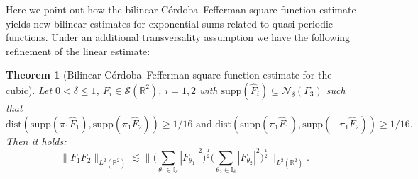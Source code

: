 \documentclass{amsart}
\newtheorem{theorem}{Theorem}[section]
\theoremstyle{definition}
\newcommand{\R}{\mathbb{R}}
\begin{document}
Here we point out how the bilinear C\'ordoba--Fefferman square function estimate yields new bilinear estimates for exponential sums related to quasi-periodic functions. Under an additional transversality assumption we have the following refinement of the linear estimate:
\begin{theorem}[Bilinear C\'ordoba--Fefferman square function estimate for the cubic]
Let $0 < \delta \leq 1$, $F_i \in \mathcal{S}(\R^2)$, $i=1,2$ with $\text{supp}(\hat{F}_i) \subseteq \mathcal{N}_{\delta}(\Gamma_3)$ such that
\begin{equation*}
\text{dist}(\text{supp}(\pi_1 \hat{F}_1),\text{supp}(\pi_1 \hat{F}_2)) \geq 1/16 \text{ and }
\text{dist}(\text{supp}(\pi_1 \hat{F}_1),\text{supp}(- \pi_1 \hat{F}_2)) \geq 1/16.
\end{equation*}
Then it holds:
\begin{equation*}
\| F_1 F_2 \|_{L^2(\R^2)} \lesssim \big\| \big( \sum_{\theta_1 \in \mathbb{I}_{\delta}} |F_{\theta_1}|^2 \big)^{\frac{1}{2}} \big( \sum_{\theta_2 \in \mathbb{I}_{\delta}} |F_{\theta_2}|^2 \big)^{\frac{1}{2}} \big\|_{L^2(\R^2)}.
\end{equation*}
\end{theorem}
\end{document}
